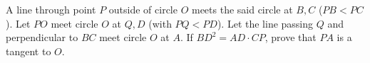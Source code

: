 A line through point $P$ outside of circle $O$ meets the said circle at $B,C$ ($PB < PC$). Let $PO$ meet circle $O$ at $Q,D$ (with $PQ < PD$). Let the line passing $Q$ and perpendicular to $BC$ meet circle $O$ at $A$. If $BD^2 = AD\cdot CP$, prove that $PA$ is a tangent to $O$.